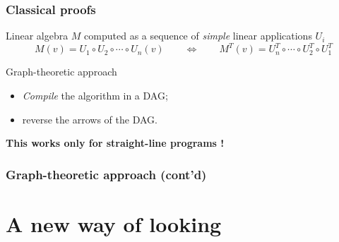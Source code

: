 \documentclass[10pt]{beamer}
\begin{document}
\begin{frame}
  \frametitle{Classical proofs}

  \begin{block}{Linear algebra}
    $M$ computed as a sequence of \emph{simple} linear applications $U_i$
    \begin{equation*}
      M(v) = U_1\circ U_2\circ\cdots\circ U_n(v)
      \qquad\Leftrightarrow\qquad
      M^T(v) = U_n^T\circ\cdots\circ U_2^T\circ U_1^T
    \end{equation*}
  \end{block}

  \begin{block}{Graph-theoretic approach}
    \begin{itemize}
    \item \emph{Compile} the algorithm in a DAG;
    \item reverse the arrows of the DAG.
    \end{itemize}
    \begin{center}
      \textbf{This works only for straight-line programs !}
    \end{center}
  \end{block}
\end{frame}


\begin{frame}
  \frametitle{Graph-theoretic approach (cont'd)}

\end{frame}


\section{A new way of looking}
\end{document}

